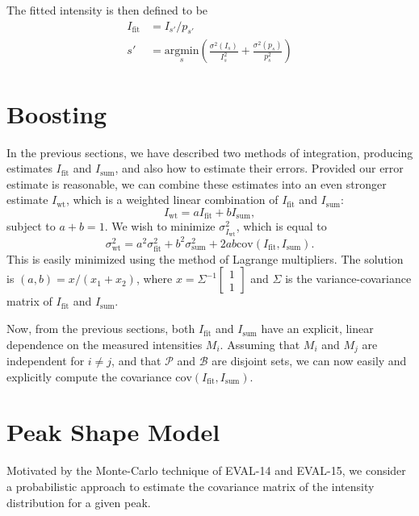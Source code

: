 \documentclass{report}
\newcommand{\cov}{\mathrm{cov}}
\newcommand{\calP}{\mathcal{P}}
\newcommand{\calB}{\mathcal{B}}
\newcommand{\Ifit}{{I_{\mathrm{fit}}}}
\newcommand{\Isum}{{I_{\mathrm{sum}}}}
\newcommand{\Iwt}{{I_{\mathrm{wt}}}}
\begin{document}
The fitted intensity is then defined to be
\begin{align}
  I_{\textrm{fit}} &= I_{s'} / p_{s'} \\
  s' &= \underset{s}{\mathrm{argmin}} \left(\frac{\sigma^2(I_s)}{I_s^2} +  \frac{\sigma^2(p_s)}{p_s^2}\right)
\end{align}


\section{Boosting}
In the previous sections, we have described two methods of integration, producing estimates $\Ifit$ and $\Isum$, and also
how to estimate their errors. Provided our error estimate is reasonable, we can combine these estimates into an even stronger
estimate $\Iwt$, which is a weighted linear combination of $\Ifit$ and $\Isum$:
\[ \Iwt = a\Ifit + b\Isum, \]
subject to $a + b = 1$. We wish to minimize $\sigma^2_\Iwt$, which is equal to
\[  \sigma^2_{\mathrm{wt}} = a^2 \sigma^2_{\mathrm{fit}} + b^2 \sigma^2_{\mathrm{sum}} + 2ab \cov(\Ifit,\Isum). \]
This is easily minimized using the method of Lagrange multipliers. The solution is $(a,b) = x/(x_1+x_2)$,
where $x = \Sigma^{-1} \begin{bmatrix} 1 \\ 1 \end{bmatrix}$ and $\Sigma$ is the variance-covariance matrix of $\Ifit$ and $\Isum$.

Now, from the previous sections, both $\Ifit$ and $\Isum$ have an explicit, linear dependence on the measured intensities $M_i$.
Assuming that $M_i$ and $M_j$ are independent for $i \neq j$, and that $\calP$ and $\calB$
are disjoint sets, we can now easily and explicitly compute the covariance $\cov(\Ifit, \Isum)$.


\section{Peak Shape Model}
Motivated by the Monte-Carlo technique of EVAL-14 and EVAL-15, we consider a probabilistic
approach to estimate the covariance matrix of the intensity distribution for a given peak.
\end{document}
